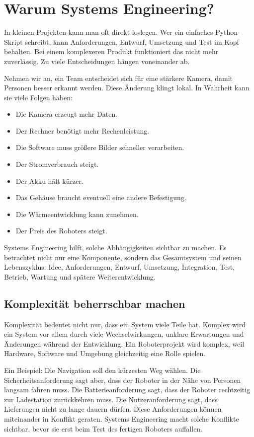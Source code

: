 \section{Warum Systems Engineering?}
In kleinen Projekten kann man oft direkt loslegen. Wer ein einfaches Python-Skript schreibt, kann Anforderungen, Entwurf, Umsetzung und Test im Kopf behalten. Bei einem komplexeren Produkt funktioniert das nicht mehr zuverlässig. Zu viele Entscheidungen hängen voneinander ab.

Nehmen wir an, ein Team entscheidet sich für eine stärkere Kamera, damit Personen besser erkannt werden. Diese Änderung klingt lokal. In Wahrheit kann sie viele Folgen haben:

\begin{itemize}
    \item Die Kamera erzeugt mehr Daten.
    \item Der Rechner benötigt mehr Rechenleistung.
    \item Die Software muss größere Bilder schneller verarbeiten.
    \item Der Stromverbrauch steigt.
    \item Der Akku hält kürzer.
    \item Das Gehäuse braucht eventuell eine andere Befestigung.
    \item Die Wärmeentwicklung kann zunehmen.
    \item Der Preis des Roboters steigt.
\end{itemize}

Systems Engineering hilft, solche Abhängigkeiten sichtbar zu machen. Es betrachtet nicht nur eine Komponente, sondern das Gesamtsystem und seinen Lebenszyklus: Idee, Anforderungen, Entwurf, Umsetzung, Integration, Test, Betrieb, Wartung und spätere Weiterentwicklung.

\subsection{Komplexität beherrschbar machen}
Komplexität bedeutet nicht nur, dass ein System viele Teile hat. Komplex wird ein System vor allem durch viele Wechselwirkungen, unklare Erwartungen und Änderungen während der Entwicklung. Ein Roboterprojekt wird komplex, weil Hardware, Software und Umgebung gleichzeitig eine Rolle spielen.

Ein Beispiel: Die Navigation soll den kürzesten Weg wählen. Die Sicherheitsanforderung sagt aber, dass der Roboter in der Nähe von Personen langsam fahren muss. Die Batterieanforderung sagt, dass der Roboter rechtzeitig zur Ladestation zurückkehren muss. Die Nutzeranforderung sagt, dass Lieferungen nicht zu lange dauern dürfen. Diese Anforderungen können miteinander in Konflikt geraten. Systems Engineering macht solche Konflikte sichtbar, bevor sie erst beim Test des fertigen Roboters auffallen.

